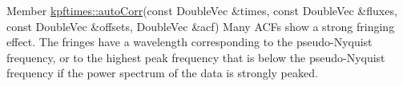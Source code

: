 \label{bug__bug000001}
\hypertarget{bug__bug000001}{}
 
\begin{DoxyDescription}
\item[Member \hyperlink{group__acf_gabbd381218252378ba3c999f49b10f522}{kpftimes::autoCorr}(const DoubleVec \&times, const DoubleVec \&fluxes, const DoubleVec \&offsets, DoubleVec \&acf) ]Many ACFs show a strong fringing effect. The fringes have a wavelength corresponding to the pseudo-\/Nyquist frequency, or to the highest peak frequency that is below the pseudo-\/Nyquist frequency if the power spectrum of the data is strongly peaked. 
\end{DoxyDescription}